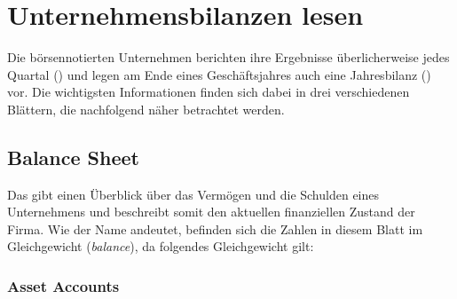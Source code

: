 
%
\chapter{Unternehmensbilanzen lesen}

Die börsennotierten Unternehmen berichten ihre Ergebnisse überlicherweise jedes Quartal  () und legen am Ende eines Geschäftsjahres auch eine Jahresbilanz () vor.
Die wichtigsten Informationen finden sich dabei in drei verschiedenen Blättern, die nachfolgend näher betrachtet werden.

%
\section{Balance Sheet}
Das  gibt einen Überblick über das Vermögen und die Schulden eines Unternehmens und beschreibt somit den aktuellen finanziellen Zustand der Firma.
Wie der Name andeutet, befinden sich die Zahlen in diesem Blatt im Gleichgewicht (\textit{balance}), da folgendes Gleichgewicht gilt:


%
\subsection{Asset Accounts}

